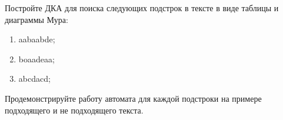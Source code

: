 \question 
Постройте ДКА для поиска следующих подстрок в тексте в виде таблицы и диаграммы Мура:
\begin{enumerate}
\item  aabaabde;
\item  boaadeaa;
\item  abcdacd;
\end{enumerate}
Продемонстрируйте работу автомата для каждой подстроки на примере подходящего и не подходящего текста.


